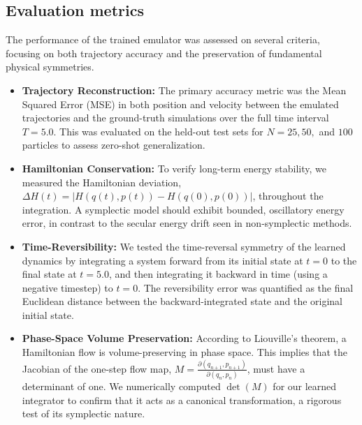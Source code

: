 \documentclass[]{article}
\begin{document}
\subsection{Evaluation metrics}
The performance of the trained emulator was assessed on several criteria, focusing on both trajectory accuracy and the preservation of fundamental physical symmetries.
\begin{itemize}
    \item \textbf{Trajectory Reconstruction:} The primary accuracy metric was the Mean Squared Error (MSE) in both position and velocity between the emulated trajectories and the ground-truth simulations over the full time interval $T=5.0$. This was evaluated on the held-out test sets for $N=25, 50,$ and $100$ particles to assess zero-shot generalization.
    \item \textbf{Hamiltonian Conservation:} To verify long-term energy stability, we measured the Hamiltonian deviation, $\Delta H(t) = |H(q(t), p(t)) - H(q(0), p(0))|$, throughout the integration. A symplectic model should exhibit bounded, oscillatory energy error, in contrast to the secular energy drift seen in non-symplectic methods.
    \item \textbf{Time-Reversibility:} We tested the time-reversal symmetry of the learned dynamics by integrating a system forward from its initial state at $t=0$ to the final state at $t=5.0$, and then integrating it backward in time (using a negative timestep) to $t=0$. The reversibility error was quantified as the final Euclidean distance between the backward-integrated state and the original initial state.
    \item \textbf{Phase-Space Volume Preservation:} According to Liouville's theorem, a Hamiltonian flow is volume-preserving in phase space. This implies that the Jacobian of the one-step flow map, $M = \frac{\partial(q_{n+1}, p_{n+1})}{\partial(q_n, p_n)}$, must have a determinant of one. We numerically computed $\det(M)$ for our learned integrator to confirm that it acts as a canonical transformation, a rigorous test of its symplectic nature.
\end{itemize}
\end{document}
